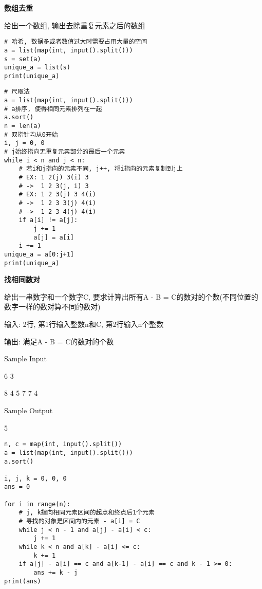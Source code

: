 \documentclass[../main]{subfiles}
\begin{document}
\begin{sloppy}
\textbf{数组去重}

给出一个数组, 输出去除重复元素之后的数组

\begin{lstlisting}[style = Python]
# 哈希, 数据多或者数值过大时需要占用大量的空间
a = list(map(int, input().split()))
s = set(a)
unique_a = list(s)
print(unique_a)
\end{lstlisting}

\begin{lstlisting}[style = Python]
# 尺取法
a = list(map(int, input().split()))
# a排序, 使得相同元素排列在一起
a.sort()
n = len(a)
# 双指针均从0开始
i, j = 0, 0
# j始终指向无重复元素部分的最后一个元素
while i < n and j < n:
    # 若i和j指向的元素不同, j++, 将i指向的元素复制到j上
    # EX: 1 2(j) 3(i) 3
    # ->  1 2 3(j, i) 3
    # EX: 1 2 3(j) 3 4(i) 
    # ->  1 2 3 3(j) 4(i)
    # ->  1 2 3 4(j) 4(i)
    if a[i] != a[j]:
        j += 1
        a[j] = a[i]
    i += 1
unique_a = a[0:j+1]
print(unique_a)
\end{lstlisting}

\newpage
\textbf{找相同数对}

给出一串数字和一个数字C, 要求计算出所有A - B = C的数对的个数(不同位置的数字一样的数对算不同的数对)

输入: 2行, 第1行输入整数n和C, 第2行输入n个整数

输出: 满足A - B = C的数对的个数

Sample Input 

6 3

8 4 5 7 7 4

Sample Output

5

\begin{lstlisting}[style = Python]
n, c = map(int, input().split())
a = list(map(int, input().split()))
a.sort()

i, j, k = 0, 0, 0
ans = 0

for i in range(n):
    # j, k指向相同元素区间的起点和终点后1个元素
    # 寻找的对象是区间内的元素 - a[i] = C
    while j < n - 1 and a[j] - a[i] < c:
        j += 1
    while k < n and a[k] - a[i] <= c:
        k += 1
    if a[j] - a[i] == c and a[k-1] - a[i] == c and k - 1 >= 0:
        ans += k - j
print(ans)
\end{lstlisting}

\end{sloppy}
\end{document}
